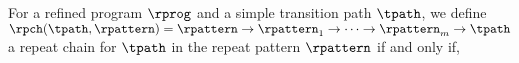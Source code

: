 \begin{enumerate}
%
  \begin{defn}
    \label{def:repeatchain-loop}
  For a refined program $\rprog$ and a simple transition path $\tpath$, we define
  $\rpch(\tpath, \rpattern) = \rpattern \to \rpattern_1 \to \cdots \to \rpattern_{m} \to \tpath$
  a repeat chain for $\tpath$ in the repeat pattern $\rpattern$
  if and only if,

\end{defn}
\end{enumerate}
